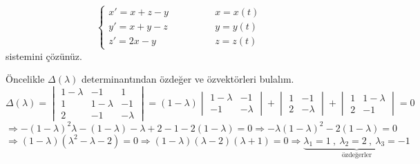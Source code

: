 \documentclass[11pt,a4paper]{article}
\begin{document}
\begin{ornek}[2]
\[
\begin{cases} x' = x + z - y & \qquad\qquad x = x(t) \\[2mm] y' = x + y - z & \qquad\qquad y = y(t) \\[2mm] z' = 2x - y & \qquad\qquad z = z(t) \end{cases}
\]
sistemini çözünüz.
\end{ornek}
\begin{cozum}
Öncelikle $\Delta(\lambda)$ determinantından özdeğer ve özvektörleri bulalım.
\[
\Delta(\lambda) = \begin{vmatrix} 1-\lambda & -1 & 1 \\ 1 & 1-\lambda & -1 \\ 2 & -1 & -\lambda \end{vmatrix} = (1-\lambda)\begin{vmatrix} 1-\lambda & -1 \\ -1 & -\lambda \end{vmatrix} + \begin{vmatrix} 1 & -1 \\ 2 & -\lambda \end{vmatrix} + \begin{vmatrix} 1 & 1-\lambda \\ 2 & -1 \end{vmatrix} = 0
\]
\[
\Rightarrow -(1-\lambda)^2\lambda - (1-\lambda) - \lambda + 2 - 1 - 2(1-\lambda) = 0 \Rightarrow -\lambda(1-\lambda)^2 - 2(1-\lambda) = 0
\]
\[
\Rightarrow (1-\lambda)(\lambda^2-\lambda-2) = 0 \Rightarrow (1-\lambda)(\lambda-2)(\lambda+1) = 0 \Rightarrow \underbrace{\lambda_1=1 \ , \ \lambda_2=2 \ , \ \lambda_3=-1}_{\text{özdeğerler}}
\]


\end{cozum}
\end{document}
